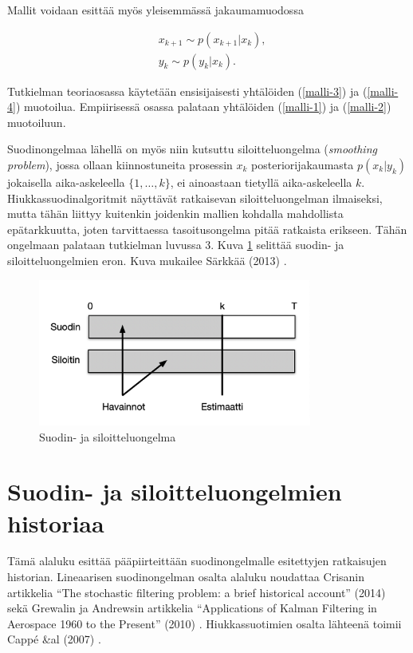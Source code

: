\documentclass[
  12pt,
  a4paper, twoside]{book}
\begin{document}
Mallit voidaan esittää myös yleisemmässä jakaumamuodossa

\begin{align}
&\label{malli-3} x_{k+1} \sim p(x_{k+1}|x_k),\\
&\label{malli-4} y_{k} \sim p(y_k|x_k).
\end{align}

\noindent Tutkielman teoriaosassa käytetään ensisijaisesti yhtälöiden (\ref{malli-3}) ja (\ref{malli-4}) muotoilua. Empiirisessä osassa palataan yhtälöiden (\ref{malli-1}) ja (\ref{malli-2}) muotoiluun.

Suodinongelmaa lähellä on myös niin kutsuttu siloitteluongelma (\emph{smoothing problem}), jossa ollaan kiinnostuneita prosessin \(x_k\) posteriorijakaumasta \(p(x_k|y_k)\) jokaisella aika-askeleella \(\{1,\ldots,k\}\), ei ainoastaan tietyllä aika-askeleella \(k\). Hiukkassuodinalgoritmit näyttävät ratkaisevan siloitteluongelman ilmaiseksi, mutta tähän liittyy kuitenkin joidenkin mallien kohdalla mahdollista epätarkkuutta, joten tarvittaessa tasoitusongelma pitää ratkaista erikseen. Tähän ongelmaan palataan tutkielman luvussa 3. Kuva \ref{fig:suodin_vs_siloitin} selittää suodin- ja siloitteluongelmien eron. Kuva mukailee Särkkää (2013) \citep{sarkka-2013}.

\begin{figure}[H]
\centering
\includegraphics[width=9cm]{suodin_vs_siloitin_cropped}
\caption{Suodin- ja siloitteluongelma}
\label{fig:suodin_vs_siloitin}
\end{figure}

\section{Suodin- ja siloitteluongelmien historiaa}

Tämä alaluku esittää pääpiirteittään suodinongelmalle esitettyjen ratkaisujen historian. Lineaarisen suodinongelman osalta alaluku noudattaa Crisanin artikkelia ``The stochastic filtering problem: a brief historical account'' (2014) \citep{crisan-2014} sekä Grewalin ja Andrewsin artikkelia ``Applications of Kalman Filtering in Aerospace 1960 to the Present'' (2010) \citep{Grewal-2010}. Hiukkassuotimien osalta lähteenä toimii Cappé \&al (2007) \citep{cappe-2007}.
\end{document}
